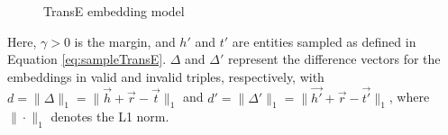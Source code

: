 		
		
		
	
	
\begin{figure}[htp]
	\centering
	\caption{TransE embedding model}
	\label{fig:TransEExplain}
\end{figure}

Here, $\gamma > 0$ is the margin, and $h'$ and $t'$ are entities sampled as defined in Equation \ref{eq:sampleTransE}. $\Delta$ and $\Delta'$ represent the difference vectors for the embeddings in valid and invalid triples, respectively, with $d = \big\|\Delta \big\|_{1} = \big\| \overrightarrow{h} + \overrightarrow{r} - \overrightarrow{t} \big\|_{1}$ and $d' = \big\|\Delta' \big\|_{1} = \big\| \overrightarrow{h'} + \overrightarrow{r} - \overrightarrow{t'} \big\|_{1}$, where $\|\cdot\|_{1}$ denotes the L1 norm.

